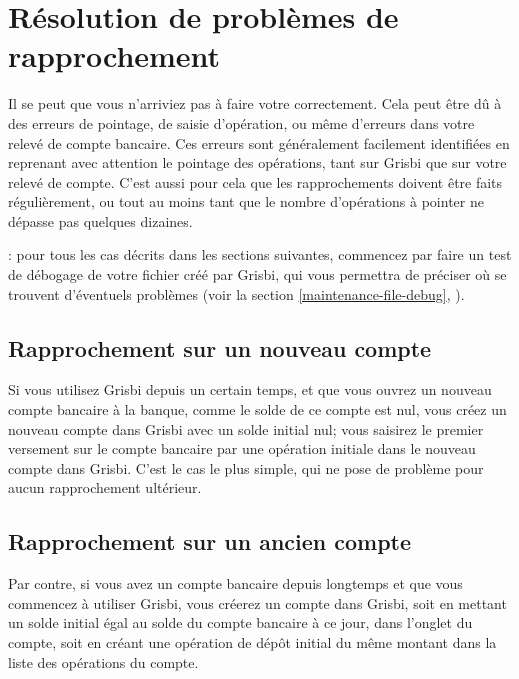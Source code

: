 \section{Résolution de problèmes de rapprochement\label{reconciliation-solve}}

Il se peut que vous n'arriviez pas à faire votre  correctement. Cela peut être dû à des erreurs de pointage, de saisie d'opération, ou même d'erreurs dans votre relevé de compte bancaire. Ces erreurs sont généralement facilement identifiées en reprenant avec attention le pointage des opérations, tant sur Grisbi que sur votre relevé de compte. C'est aussi pour cela que les rapprochements doivent être faits régulièrement, ou tout au moins tant que le nombre d'opérations à pointer ne dépasse pas quelques dizaines.

\Note{}: pour tous les cas décrits dans les sections suivantes, commencez par faire un test de débogage de votre fichier créé par Grisbi, qui vous permettra de préciser où se trouvent d'éventuels problèmes (voir la section \vref{maintenance-file-debug}, ).


\subsection{Rapprochement sur un nouveau compte\label{reconciliation-solve-new}}

Si vous utilisez Grisbi depuis un certain temps, et que vous ouvrez un nouveau compte bancaire à la banque, comme le solde de ce compte est nul, vous créez un nouveau compte dans Grisbi avec un solde initial nul; vous saisirez le premier versement sur le compte bancaire par une opération initiale dans le nouveau compte dans Grisbi. C'est le cas le plus simple, qui ne pose de problème pour aucun rapprochement ultérieur.


\subsection{Rapprochement sur un ancien compte\label{reconciliation-solve-old}}

Par contre, si vous avez un compte bancaire depuis longtemps et que vous commencez à utiliser Grisbi, vous créerez un compte dans Grisbi, soit en mettant un solde initial égal au solde du compte bancaire à ce jour, dans l'onglet  du compte, soit en créant une opération de dépôt initial du même montant dans la liste des opérations du compte. 

